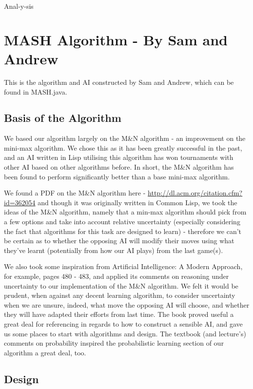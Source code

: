 \documentclass[11pt]{article}
\begin{document}
Anal-y-sis
\section{MASH Algorithm - By Sam and Andrew}
\label{sec-3}

This is the algorithm and AI constructed by Sam and Andrew, which can be found in MASH.java.

\subsection{Basis of the Algorithm}
\label{sec-3-1}

We based our algorithm largely on the M\&N algorithm - an improvement on the mini-max algorithm. We chose this as it has been greatly successful in the past, and an AI written in Lisp utilising this algorithm has won tournaments with other AI based on other algorithms before. In short, the M\&N algorithm has been found to perform significantly better than a base mini-max algorithm.

We found a PDF on the M\&N algorithm here - \url{http://dl.acm.org/citation.cfm?id=362054} and though it was originally written in Common Lisp, we took the ideas of the M\&N algorithm, namely that a min-max algorithm should pick from a few options and take into account relative uncertainty (especially considering the fact that algorithms for this task are designed to learn) - therefore we can't be certain as to whether the opposing AI will modify their moves using what they've learnt (potentially from how our AI plays) from the last game(s).

We also took some inspiration from Artificial Intelligence: A Modern Approach, for example, pages 480 - 483, and applied its comments on reasoning under uncertainty to our implementation of the M\&N algorithm. We felt it would be prudent, when against any decent learning algorithm, to consider uncertainty when we are unsure, indeed, what move the opposing AI will choose, and whether they will have adapted their efforts from last time. The book proved useful a great deal for referencing in regards to how to construct a sensible AI, and gave us some places to start with algorithms and design. The textbook (and lecture's) comments on probability inspired the probabilistic learning section of our algorithm a great deal, too.
\subsection{Design}
\label{sec-3-2}
\end{document}
